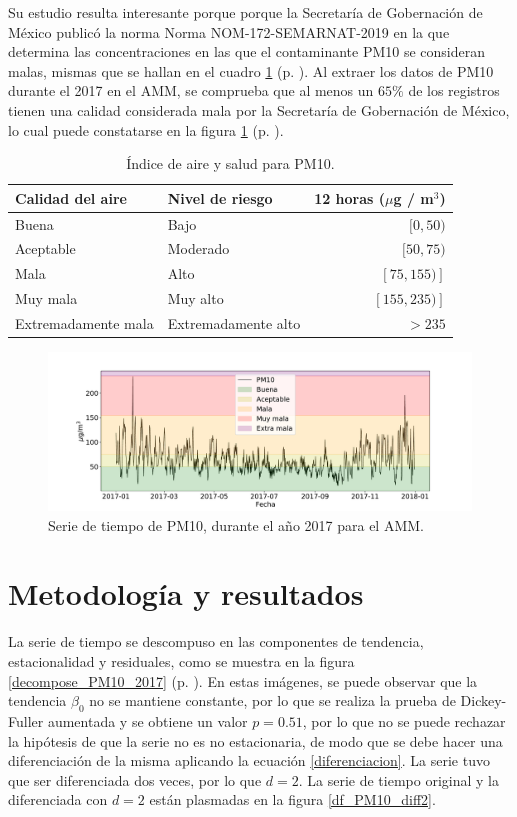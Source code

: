 \documentclass{elsarticle}
\begin{document}
Su estudio resulta interesante porque porque la Secretaría de Gobernación de México publicó la norma Norma NOM-172-SEMARNAT-2019 \cite{semarnat} en la que determina las concentraciones en las que el contaminante PM10 se consideran malas, mismas que se hallan en el cuadro \ref{semarnat} (p. \pageref{semarnat}). Al extraer los datos de PM10 durante el 2017 en el AMM, se comprueba que al menos un $65\%$ de los registros tienen una calidad considerada mala por la Secretaría de Gobernación de México, lo cual puede constatarse en la figura \ref{ts_2017_pm10} (p. \pageref{ts_2017_pm10}).

\begin{table}
	\centering
	\caption{Índice de aire y salud para PM10.}
	\label{semarnat}
	\begin{tabular}{|l|l|r|}
	\hline
	\textbf{Calidad del aire}  & \textbf{Nivel de riesgo} & \textbf{12 horas ($\mu$g / m$^3$)} \\ 
	\hline
	Buena & Bajo & $[0, 50)$ \\
	Aceptable & Moderado & $[50, 75)$ \\
	Mala & Alto & $[75, 155)]$ \\
	Muy mala & Muy alto & $[155, 235)]$ \\
	Extremadamente mala & Extremadamente alto & $> 235$ \\
	\hline
	\end{tabular}
\end{table}

\begin{figure}
\centering
	\includegraphics[width=1\textwidth]{ts_2017_pm10.pdf}
	\caption{Serie de tiempo de PM10, durante el año 2017 para el AMM.}
	\label{ts_2017_pm10}
\end{figure}

\section{Metodología y resultados}
\label{metodologia}
La serie de tiempo se descompuso en las componentes de tendencia, estacionalidad y residuales, como se muestra en la figura \ref{decompose_PM10_2017} (p. \pageref{decompose_PM10_2017}). En estas imágenes, se puede observar que la tendencia $\beta_0$ no se mantiene constante, por lo que se realiza la prueba de Dickey-Fuller aumentada y se obtiene un valor $p = 0.51$, por lo que no se puede rechazar la hipótesis de que la serie no es no estacionaria, de modo que se debe hacer una diferenciación de la misma aplicando la ecuación \ref{diferenciacion}. La serie tuvo que ser diferenciada dos veces, por lo que $d = 2$. La serie de tiempo original y la diferenciada con $d = 2$ están plasmadas en la figura \ref{df_PM10_diff2}.
\end{document}
